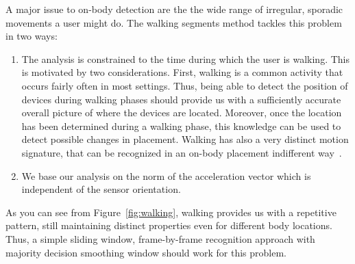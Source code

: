A major issue to on-body detection are the the
wide range of irregular, sporadic movements a user might do. The
walking segments method tackles this problem in two ways:
\begin{enumerate}
\item The analysis is constrained to the time during which the user is
  walking.  This is motivated by two considerations.  First, walking
  is a common activity that occurs fairly often in most
  settings. Thus, being able to detect the position of devices during
  walking phases should provide us with a sufficiently accurate
  overall picture of where the devices are located. Moreover, once
  the location has been determined during a walking phase, this
  knowledge can be used to detect possible changes in placement.
  Walking has also a very distinct motion signature, that 
  can be recognized in an on-body placement indifferent way~\cite{sekine2000,seon2001recognition}.
\item We base our analysis on the norm of the acceleration vector
  which is independent of the sensor orientation.  
\end{enumerate} 

As you can see from Figure~\ref{fig:walking}, walking provides us with
a repetitive pattern, still maintaining distinct properties even for
different body locations. Thus, a simple sliding window, frame-by-frame
recognition approach with majority decision smoothing window should work for
this problem.


